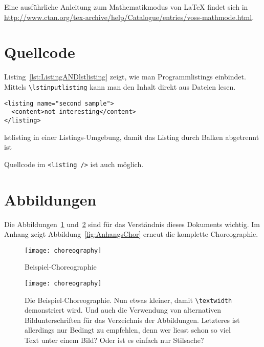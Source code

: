 Eine ausführliche Anleitung zum Mathematikmodus von LaTeX findet sich in \url{http://www.ctan.org/tex-archive/help/Catalogue/entries/voss-mathmode.html}.

\section{Quellcode}
Listing~\ref{lst:ListingANDlstlisting} zeigt, wie man Programmlistings einbindet.  Mittels \texttt{\textbackslash lstinputlisting} kann man den Inhalt direkt aus Dateien lesen.

\begin{Listing}
\begin{lstlisting}
<listing name="second sample">
  <content>not interesting</content>
</listing>
\end{lstlisting}
\caption{lstlisting in einer Listings-Umgebung, damit das Listing durch Balken abgetrennt ist}
\label{lst:ListingANDlstlisting}
\end{Listing}

Quellcode im \lstinline|<listing />| ist auch möglich.

\section{Abbildungen}
Die Abbildungen~\ref{fig:chor1} und~\ref{fig:chor2} sind für das Verständnis dieses Dokuments
wichtig. Im Anhang zeigt Abbildung~\vref{fig:AnhangsChor} erneut die komplette Choreographie.

\begin{figure}
  \begin{center}
    \texttt{[image: choreography]}
    \caption{Beispiel-Choreographie}
    \label{fig:chor1}
  \end{center}
\end{figure}

\begin{figure}
  \begin{center}
    \texttt{[image: choreography]}
    \caption[Beispiel-Choreographie]{Die Beispiel-Choreographie. Nun etwas kleiner, damit \texttt{\textbackslash textwidth} demonstriert wird. Und auch die Verwendung von alternativen Bildunterschriften für das Verzeichnis der Abbildungen. Letzteres ist allerdings nur Bedingt zu empfehlen, denn wer liesst schon so viel Text unter einem Bild? Oder ist es einfach nur Stilsache?}
    \label{fig:chor2}
  \end{center}
\end{figure}

